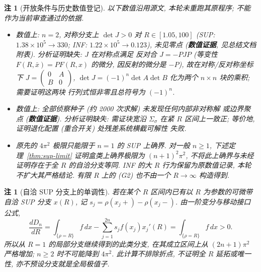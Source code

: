 \documentclass[UTF8]{ctexart}
\newtheorem{remark}[theorem]{注}
\newcommand{\EVIDENCE}{\textbf{数值证据}}
\begin{document}
\begin{remark}[开放条件与历史数值登记]
以下数值沿用源文, 本轮未重跑其原程序; 不能作为当前审查通过的依据.
\begin{itemize}
	\item[(G1$'$)] 数值上: $n=2$, 对称分支上 $\det J>0$ 对
	$R\in[1.05,100]$ (SUP: $1.38\times10^5\to330$; INF: $1.22\times10^5\to0.123$),
	未见零点 (\EVIDENCE, 见总结文档附表). 分析证明缺失: $J$ 在对称点满足
	反对合 $J=-PJP$ (等变性 $F(R,\bar x)=PF(R,x)$ 的微分, 因反射的微分是
	$-P$), 故在对称/反对称坐标下 $J=\begin{pmatrix}0&A\\B&0\end{pmatrix}$,
	$\det J=(-1)^n\det A\det B$ 化为两个 $n\times n$ 块的乘积; 需要证明这两块
	行列式恒非零且总符号为 $(-1)^n$.
	\item[(G2)] 数值上: 全部侦察种子 (约 2000 次求解) 未发现任何内部非对称解
	或边界聚点 (\EVIDENCE). 分析证明缺失: 需证块宽沿 $\Sigma_\sigma$ 在紧
	$R$ 区间上一致正; 等价地, 证明退化配置 (重合开关) 处残差系统横截可解性
	失败.
	\item 原先的 $4\pi^2$ 极限只能限于 $n=1$ 的 SUP 上确界.
	对一般 $n\ge1$, 下述定理~\ref{thm:sup-limit} 证明盒类上确界极限为
	$(n+1)^2\pi^2$, 不将此上确界与未经证明存在于全 $R$ 的自洽分支等同.
	INF 的大 $R$ 行为保留为原数值记录, 本轮不扩大其严格结论.
	有限 $R$ 上的 (G2) 也不由一个 $R\to\infty$ 构造得到.
\end{itemize}
\end{remark}

\begin{remark}[自洽 SUP 分支上的单调性]\label{rem:sup-branch}
若在某个 $R$ 区间内已有以 $R$ 为参数的可微带自洽 SUP 分支 $x(R)$,
记 $s_j=\rho(x_j+)-\rho(x_j-)$. 由一阶变分与移动接口公式,
\begin{equation*}
\frac{dD_n}{dR}=\int_{\{\rho=R\}}f\,dx-
\sum_{j=1}^{2n}s_j f(x_j)x_j'(R)=\int_{\{\rho=R\}}f\,dx>0.
\end{equation*}
所以从 $R=1$ 的局部分支继续得到的此类分支, 在其成立区间上从
$(2n+1)\pi^2$ 严格增加; $n\ge2$ 时不可能降到 $4\pi^2$.
此计算不排除折点, 不证明全 $R$ 延拓或唯一性, 亦不预设分支就是全局极值子.
\end{remark}
\end{document}
